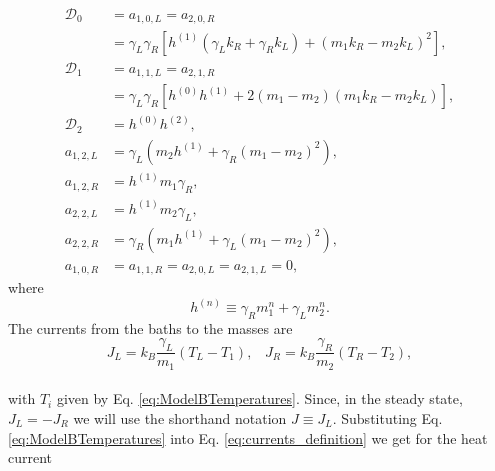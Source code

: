   \begin{align}
    \mathcal{D}_0 &= a_{1,0,L} = a_{2,0,R}
    \nonumber\\
    & = \gamma _L \gamma _R\! \left[h^{(1)}\! \left(\gamma_L k_R +\gamma_R k_L \right)+\left(m_1 k_R-m_2 k_L\right)^2\right]\!,
    \nonumber\\
    \mathcal{D}_1 &= a_{1,1,L} = a_{2,1,R}
    \nonumber\\
    &= \gamma _L \gamma _R\! \left[h^{(0)} h^{(1)}\!+2 \left(m_1-m_2\right) \left(m_1 k_R-m_2 k_L\right)\right]\!,
    \nonumber\\
    \mathcal{D}_2 &= h^{(0)} h^{(2)},\nonumber
    \\
    a_{1,2,L} &= \gamma _L \left(m_2 h^{(1)} + \gamma_R (m_1 - m_2)^2 \right),\nonumber
    \\
    a_{1,2,R} &= h^{(1)} m_1 \gamma_R,\nonumber
    \\
    a_{2,2,L} &= h^{(1)} m_2 \gamma_L,\nonumber
    \\
    a_{2,2,R} &= \gamma _R \left( m_1 h^{(1)} + \gamma_L (m_1-m_2)^2 \right),\nonumber
    \\
    a_{1,0,R} &= a_{1,1,R} = a_{2,0,L} = a_{2,1,L} = 0,
    \label{eq:SolutionPolynomialCoefficients}
  \end{align}
%
where
%
\begin{equation}
h^{(n)}\equiv \gamma_R m_1^n + \gamma_L m_2^n.
\end{equation}
%
The currents from the baths to the masses \cite{Simon2019} are
%
\begin{equation}
    J_L = k_B \frac{\gamma_L}{m_1} \left( T_L - T_1 \right),\;\;\;
    J_R = k_B \frac{\gamma_R}{m_2} \left( T_R - T_2 \right),
    \label{eq:currents_definition}
\end{equation}
\\
%
with $T_i$ given by Eq. \eqref{eq:ModelBTemperatures}. Since, in the steady state, $J_L = -J_R$ we will use the shorthand notation $J \equiv J_L$. Substituting Eq. \eqref{eq:ModelBTemperatures} into Eq.  \eqref{eq:currents_definition} we get for the heat current
%
